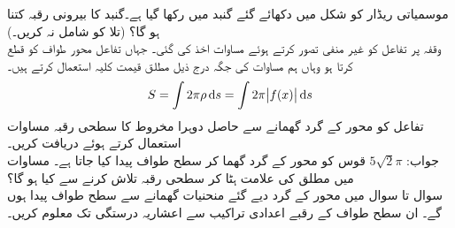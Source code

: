 موسمیاتی ریڈار کو شکل  میں دکھائے گئے  گنبد میں رکھا گیا ہے۔گنبد کا بیرونی رقبہ کتنا ہو گا؟ (تلا  کو شامل نہ کریں۔)
\\
وقفہ  پر تفاعل  کو غیر منفی تصور کرتے ہوئے  مساوات  اخذ کی گئی۔ جہاں تفاعل محور طواف کو قطع کرتا ہو وہاں ہم مساوات  کی جگہ درج ذیل مطلق قیمت کلیہ استعمال کرتے ہیں۔
\begin{align}\label{مساوات_تکمل_استعمال_سطحی_رقبہ_ٹ}
S=\int 2\pi \rho \dif s=\int 2\pi \abs{f(x)}\dif s
\end{align}
تفاعل   کو محور  کے گرد گھمانے سے حاصل دوہرا مخروط کا سطحی رقبہ مساوات  استعمال کرتے ہوئے  دریافت کریں۔\\
جواب:\quad
$5\sqrt{2}\pi$
قوس  کو محور  کے گرد گھما کر سطح طواف پیدا کیا جاتا ہے۔ مساوات  میں مطلق کی علامت ہٹا کر سطحی رقبہ تلاش کرنے سے کیا ہو گا؟
\\
سوال  تا سوال  میں محور  کے گرد دیے گئے منحنیات گھمانے سے سطح طواف پیدا ہوں گے۔ ان سطح طواف کے رقبے اعدادی تراکیب سے  اعشاریہ درستگی تک معلوم کریں۔

